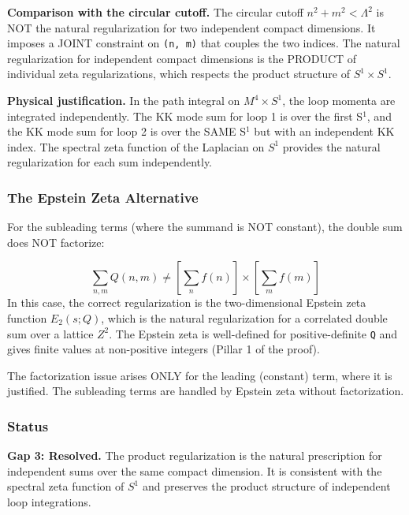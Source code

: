 \documentclass[aps,prd,preprint,superscriptaddress,longbibliography,floatfix]{revtex4-2}
\theoremstyle{remark}
\begin{document}
\textbf{Comparison with the circular cutoff.} The circular cutoff $n^{2} + m^{2} < \Lambda^{2}$ is NOT the natural regularization for two independent compact dimensions. It imposes a JOINT constraint on \texttt{(n, m)} that couples the two indices. The natural regularization for independent compact dimensions is the PRODUCT of individual zeta regularizations, which respects the product structure of $S^{1} \times S^{1}$.

\textbf{Physical justification.} In the path integral on $M^{4} \times S^{1}$, the loop momenta are integrated independently. The KK mode sum for loop 1 is over the first S$^{1}$, and the KK mode sum for loop 2 is over the SAME S$^{1}$ but with an independent KK index. The spectral zeta function of the Laplacian on $S^{1}$ provides the natural regularization for each sum independently.


\subsubsection{The Epstein Zeta Alternative}

For the subleading terms (where the summand is NOT constant), the double sum does NOT factorize:


\begin{equation}
    \sum_{n,m} Q(n,m) \neq [\sum_n f(n)] \times [\sum_m f(m)]
\end{equation}
In this case, the correct regularization is the two-dimensional Epstein zeta function $E_{2}(s; Q)$, which is the natural regularization for a correlated double sum over a lattice $Z^{2}$. The Epstein zeta is well-defined for positive-definite \texttt{Q} and gives finite values at non-positive integers (Pillar 1 of the proof).

The factorization issue arises ONLY for the leading (constant) term, where it is justified. The subleading terms are handled by Epstein zeta without factorization.


\subsubsection{Status}

\textbf{Gap 3: Resolved.} The product regularization is the natural prescription for independent sums over the same compact dimension. It is consistent with the spectral zeta function of $S^{1}$ and preserves the product structure of independent loop integrations.
\end{document}
